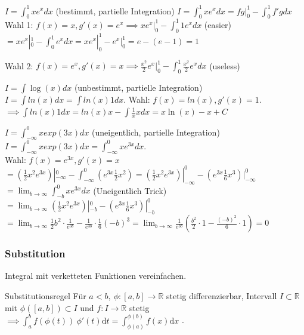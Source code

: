\documentclass[a4paper]{article}
\newcommand\R{\ensuremath{\mathbb{R}}}
\begin{document}
\begin{bspbox}{$I = \int_0^1 xe^xdx$ (bestimmt, partielle Integration)}
  $I = \int_0^1 xe^xdx = fg |_0^1 - \int_0^1 f'gdx$ \\
  Wahl 1: $f(x) = x, g'(x) = e^x \implies xe^x |_0^1 - \int_0^1 1e^xdx$ (easier) \\
  $= xe^x |_0^1 - \int_0^1 e^x dx = xe^x |_0^1 - e^x |_0^1 = e-(e-1) = 1$

  \tiny \color{gray}
    Wahl 2: $f(x) = e^x, g'(x) = x \implies \frac{x^2}{2}e^x|_0^1 - \int_0^1 \frac{x^2}{2}e^xdx$ (useless) \\
  \normalsize \color{black}
\end{bspbox}

\begin{bspbox}{$I = \int \log(x) dx$ (unbestimmt, partielle Integration)}
  $I = \int ln(x)dx = \int ln(x)1dx$. Wahl: $f(x) = ln(x), g'(x) = 1$. \\
  $\implies \int ln(x)1dx = ln(x)x - \int \frac{1}{x}xdx = x \ln(x)-x + C$ \\
\end{bspbox}

\begin{bspbox}{$I = \int_{-\infty}^{0} xexp(3x) dx$ (uneigentlich, partielle Integration)}
  $I = \int_{-\infty}^{0} xexp(3x)dx =  \int_{-\infty}^{0} xe^{3x} dx$. \\
  Wahl: $f(x) = e^{3x}, g'(x) = x$ \\
  $ = (\frac{1}{2} x^2e^{3x})|_{-\infty}^0 - \int_{-\infty}^{0}(e^{3x} \frac{1}{2}x^2) = (\frac{1}{2} x^2e^{3x})|_{-\infty}^0 - (e^{3x}\frac{1}{6}x^3)|_{-\infty}^0$
  $ = \lim_{b \to \infty} \int_{-b}^{0} xe^{3x}dx$ \qquad (Uneigentlich Trick)  \\
  $= \lim_{b \to \infty} (\frac{1}{2} x^2e^{3x})|_{-b}^0 - (e^{3x}\frac{1}{6}x^3)|_{-b}^0$ 
  $ = \lim_{b \to \infty} \frac{1}{2}b^2 \cdot \frac{1}{e^{3b}} - \frac{1}{e^{3b}} \cdot \frac{1}{6}(-b)^3 = \lim_{b \to \infty} \frac{1}{e^{3b}} (\frac{b^2}{2} \cdot 1 -\frac{(-b)^2}{6} \cdot 1) = 0$
\end{bspbox}

\subsubsection{Substitution}
Integral mit verketteten Funktionen vereinfachen. \\
\begin{mainbox}{Substitutionsregel}
  Für $a < b, \ \phi: [a, b] \to \R$ stetig differenzierbar, Intervall $I \subset \R$ mit $\phi([a,b]) \subset I$ und $f: I \to \R$ stetig 
  $\implies \int_{a}^{b} f(\phi(t)) \ \phi'(t) \mathrm{d}t = \int_{\phi(a)}^{\phi(b)} f(x) \mathrm{d}x$ .
\end{mainbox}
\end{document}
